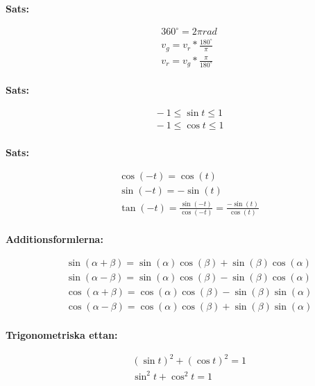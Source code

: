 \newpage
\begin{multicols}{2}
\textbf{Sats:}\par
\begin{align*}
  &\quad 360^\circ = 2\pi rad \\
  &\quad v_{g} = v_{r} * \frac{180^\circ}{\pi} \\
  &\quad v_{r} = v_{g} * \frac{\pi}{180^\circ} \\
\end{align*}

\textbf{Sats:}\par
\begin{align*}
  &\quad -1 \leq \sin{t} \leq 1 \\
  &\quad -1 \leq \cos{t} \leq 1 \\
\end{align*}

\textbf{Sats:}\par
\begin{align*}
  &\quad \cos{(-t)} = \cos{(t)} \\
  &\quad \sin{(-t)} = -\sin{(t)} \\
  &\quad \tan{(-t)} = \frac{\sin{(-t)}}{\cos{(-t)}} = \frac{-\sin{(t)}}{\cos{(t)}} \\
\end{align*}

\textbf{Additionsformlerna:}\par
\begin{align*}
  &\quad \sin{(\alpha + \beta)} = \sin{(\alpha)}\cos{(\beta)} + \sin{(\beta)}\cos{(\alpha)} \\
  &\quad \sin{(\alpha - \beta)} = \sin{(\alpha)}\cos{(\beta)} - \sin{(\beta)}\cos{(\alpha)} \\
  &\quad \cos{(\alpha + \beta)} = \cos{(\alpha)}\cos{(\beta)} - \sin{(\beta)}\sin{(\alpha)} \\
  &\quad \cos{(\alpha - \beta)} = \cos{(\alpha)}\cos{(\beta)} + \sin{(\beta)}\sin{(\alpha)} \\ 
\end{align*}

\textbf{Trigonometriska ettan:}\par
\begin{align*}
  &\quad (\sin{t})^{2} + (\cos{t})^{2} = 1 \\
  &\quad \sin^{2}{t} + \cos^{2}{t} = 1 \\ 
\end{align*}



\end{multicols}
